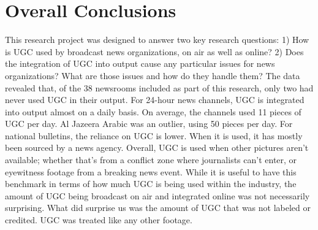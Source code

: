 \documentclass[symmetric, notoc, nobib]{towcenter-book}
\begin{document}
\chapter{Overall Conclusions}
This research project was designed to answer two key research questions:
1) How is UGC used by broadcast news organizations, on air as
well as online?
2) Does the integration of UGC into output cause any particular
issues for news organizations? What are those issues and how do
they handle them?
The data revealed that, of the 38 newsrooms included as part of this research,
only two had never used UGC in their output. For 24-hour news channels,
UGC is integrated into output almost on a daily basis. On average, the channels
used 11 pieces of UGC per day. Al Jazeera Arabic was an outlier, using
50 pieces per day.
For national bulletins, the reliance on UGC is lower. When it is used, it has
mostly been sourced by a news agency. Overall, UGC is used when other
pictures aren't available; whether that's from a conflict zone where journalists
can't enter, or eyewitness footage from a breaking news event.
While it is useful to have this benchmark in terms of how much UGC is
being used within the industry, the amount of UGC being broadcast on air
and integrated online was not necessarily surprising. What did surprise us
was the amount of UGC that was not labeled or credited. UGC was treated
like any other footage.
\end{document}

